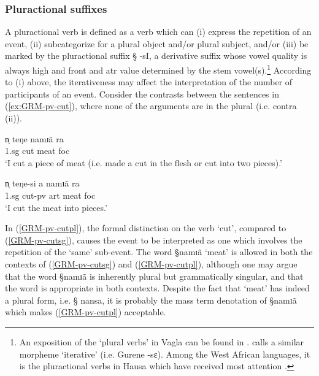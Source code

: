 \subsubsection{Pluractional suffixes}
\label{sec:GRM-PluralVerb}


A pluractional verb is defined as a verb which can (i) express the repetition of
an event,  (ii)   subcategorize for a plural object and/or  plural subject,
and/or  (iii)  be marked by the pluractional suffix {\S
-sI}, a derivative suffix whose  vowel quality is always high and
front
and  {\sc atr} value determined by the stem vowel(s).\footnote{An exposition of
the
`plural verbs' in Vagla can be found in \cite{Blen03}. \citet[viii]{Daku07}
calls a similar morpheme `iterative' (i.e. Gurene {\F -sɛ}).  Among the West
African
languages, it is the pluractional verbs in Hausa which have received most
attention \citep[see][]{Jose08}.}  According to (i) above, the iterativeness may
affect the interpretation of the number of participants of an event. Consider
the contrasts between the 
sentences in (\ref{ex:GRM-pv-cut}), where none of the arguments are in the
plural (i.e. contra (ii)).


\begin{exe}
\ex\label{ex:GRM-pv-cut}
  \begin{xlist}
    \ex\label{GRM-pv-cutsg}
\gll   n̩  teŋe  namɪã  ra  \\
       {\sc 1.sg} {cut} {meat} {\sc foc}\\
\glt `I cut a piece of meat (i.e.  made a cut in the flesh or cut into two
pieces).'

\ex\label{GRM-pv-cutpl}
\gll    n̩    teŋe-si  a  namɪã  ra \\
          {\sc 1.sg} {cut-{\sc pv}} {\sc art} {meat} {\sc foc}\\
\glt `I cut the meat into pieces.'

 \end{xlist}
\end{exe}

In  (\ref{GRM-pv-cutpl}),  the formal distinction on the verb `cut',  compared
to (\ref{GRM-pv-cutsg}),  causes  the event to be interpreted as one which
involves the repetition of the `same'  sub-event.  The word {\S namɪã} `meat'
is allowed in both the contexts of (\ref{GRM-pv-cutsg}) and
(\ref{GRM-pv-cutpl}), although one may argue that the word {\S namɪã} is
inherently
plural but grammatically singular,  and that the word is appropriate in both
contexts. Despite the fact that  `meat' has indeed a plural form, i.e. {\S
nansa}, it is probably the mass term denotation of {\S namɪã} which 
makes (\ref{GRM-pv-cutpl}) acceptable.

